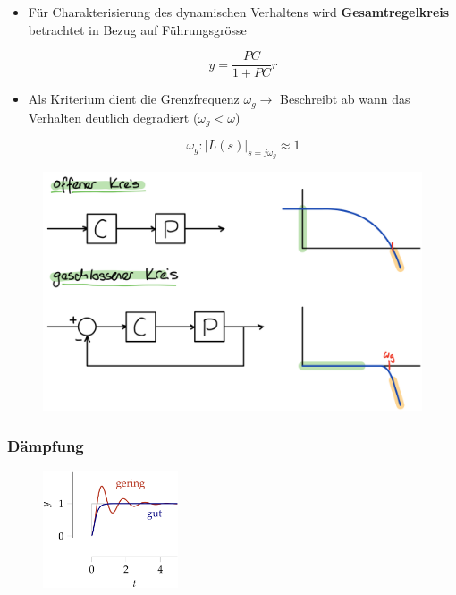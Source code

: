 \documentclass[
  10pt,
  a4paper,
]{article}
\numberwithin{equation}{section}
\begin{document}
\begin{multicols}{2}
\begin{figure}[H]
{}

\end{figure}

\begin{itemize}
\item
  Für Charakterisierung des dynamischen Verhaltens wird
  \textbf{Gesamtregelkreis} betrachtet in Bezug auf Führungsgrösse

  \[
  y = \frac{PC}{1+PC}r
  \]
\item
  Als Kriterium dient die Grenzfrequenz \(\omega_g \rightarrow\)
  Beschreibt ab wann das Verhalten deutlich degradiert
  (\(\omega_g<\omega\))

  \[
  \omega_g: \lvert L(s) \rvert_{s=j\omega_g}\approx 1
  \]
\end{itemize}

\begin{figure}[H]

{\centering \includegraphics{images/paste-15.png}

}

\end{figure}

\hypertarget{duxe4mpfung}{%
\subsubsection{Dämpfung}\label{duxe4mpfung}}

\begin{figure}[H]

{\centering \includegraphics[width=4cm,height=\textheight]{images/paste-14.png}

}
\end{figure}
\end{multicols}
\end{document}
